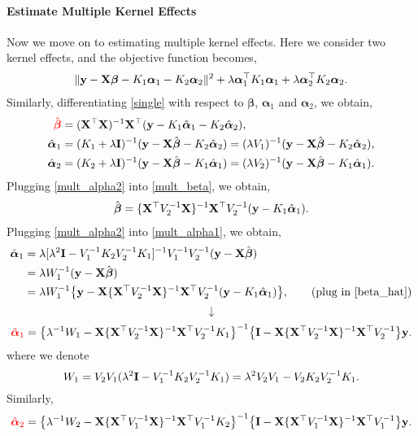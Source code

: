 \documentclass[11pt]{report}
\def\bI{{\bf I}}
\def\bX{{\bf X}}
\def\by{{\bf y}}
\def\bbeta{{\boldsymbol \beta}}
\def\balpha{{\boldsymbol \alpha}}
\begin{document}
\paragraph{Estimate Multiple Kernel Effects}
Now we move on to estimating multiple kernel effects. Here we consider two kernel effects, and the objective function becomes, 
\begin{align}
\lVert \by-\bX \bbeta -K_1 \balpha_1 -K_2 \balpha_2 \rVert^2 + \lambda \balpha_1^\top K_1 \balpha_1+ \lambda \balpha_2^\top K_2 \balpha_2. \label{mult}
\end{align}
Similarly, differentiating \eqref{single} with respect to $\bbeta$, $\balpha_1$ and $\balpha_2$, we obtain, 
\begin{align}
{\color{red}\hat{\bbeta}}&=(\bX^\top \bX)^{-1}\bX^\top (\by-K_1 \hat{\balpha}_1-K_2 \hat{\balpha}_2),  \label{mult_beta}\\
\hat{\balpha}_1&=(K_1+\lambda \bI)^{-1}(\by-\bX \hat{\bbeta}-K_2 \hat{\balpha}_2)=(\lambda V_1)^{-1}(\by-\bX \hat{\bbeta}-K_2 \hat{\balpha}_2), \label{mult_alpha1}\\
\hat{\balpha}_2&=(K_2+\lambda \bI)^{-1}(\by-\bX \hat{\bbeta}-K_1 \hat{\balpha}_1)=(\lambda V_2)^{-1}(\by-\bX \hat{\bbeta}-K_1 \hat{\balpha}_1). \label{mult_alpha2}
\end{align}
Plugging \eqref{mult_alpha2} into \eqref{mult_beta}, we obtain,
\begin{align}
\hat{\bbeta}=\{\bX^\top V_2^{-1} \bX \}^{-1}\bX^\top V_2^{-1}(\by-K_1 \hat{\balpha}_1). \label{beta_hat}
\end{align}
Plugging \eqref{mult_alpha2} into \eqref{mult_alpha1}, we obtain,
\begin{align}
\hat{\balpha}_1&=\lambda [\lambda^2 \bI - V_1^{-1}K_2 V_2^{-1}K_1]^{-1}V_1^{-1} V_2^{-1}(\by-\bX \hat{\bbeta}) \nonumber \\
&=\lambda W_1^{-1}(\by-\bX \hat{\bbeta}) \nonumber \\
&=\lambda W_1^{-1}\big\{\by-\bX \{\bX^\top V_2^{-1} \bX \}^{-1}\bX^\top V_2^{-1}(\by-K_1 \hat{\balpha}_1)\big\}, \tag{plug in \eqref{beta_hat}}
\end{align}
\[\downarrow\]
\begin{align}
{\color{red}\hat{\balpha}_1}=\big\{\lambda^{-1}W_1-\bX \{\bX^\top V_2^{-1} \bX \}^{-1}\bX^\top V_2^{-1} K_1\big\}^{-1} \big\{\bI-\bX \{\bX^\top V_2^{-1} \bX \}^{-1}\bX^\top V_2^{-1}\big\}\by.
\end{align}
where we denote \[W_1=V_2V_1(\lambda^2 \bI - V_1^{-1}K_2 V_2^{-1}K_1)=\lambda^2 V_2V_1-V_2K_2V_2^{-1}K_1.\]
Similarly,
\begin{align}
{\color{red}\hat{\balpha}_2}=\big\{\lambda^{-1}W_2-\bX \{\bX^\top V_1^{-1} \bX \}^{-1}\bX^\top V_1^{-1} K_2\big\}^{-1} \big\{\bI-\bX \{\bX^\top V_1^{-1} \bX \}^{-1}\bX^\top V_1^{-1}\big\}\by.
\end{align}
\end{document}
